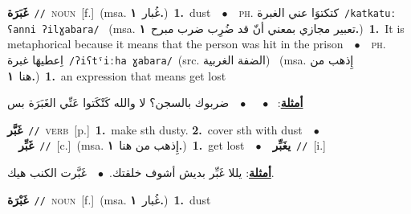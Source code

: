 \documentclass[10pt,a4paper,twoside]{article} %
\begin{document}
\begin{multicols}{2}
{\setlength\topsep{0pt}\textbf{\foreignlanguage{arabic}{غَبَرَة}}\ {\color{gray}\texttt{//}\color{black}}\ \textsc{noun}\ [f.]\ \color{gray}(msa. \foreignlanguage{arabic}{غُبار}~\foreignlanguage{arabic}{\textbf{١.}})\color{black}\ \textbf{1.}~dust\ \ $\bullet$\ \ \textsc{ph.} \color{gray} \foreignlanguage{arabic}{كتكتوَا عني الغبرة}\color{black}\ {\color{gray}\texttt{/{\sffamily katkatuː ʕanni ʔilɣabara}/}\color{black}}\ \color{gray} (msa. \foreignlanguage{arabic}{تعبير مجازي بمعني أنّ قد ضُرِب ضرب مبرح}~\foreignlanguage{arabic}{\textbf{١.}})\color{black}\ \textbf{1.}~It is metaphorical because it means that the person was hit in the prison\ \ $\bullet$\ \ \textsc{ph.} \color{gray} \foreignlanguage{arabic}{اِعطيهَا غبرة}\color{black}\ {\color{gray}\texttt{/{\sffamily ʔiʕtˤiːha ɣabara}/}\color{black}}\ \color{gray}(src. \foreignlanguage{arabic}{الضفة الغربية})\color{black}\ \color{gray} (msa. \foreignlanguage{arabic}{إِذهب من هنا}~\foreignlanguage{arabic}{\textbf{١.}})\color{black}\ \textbf{1.}~an expression that means get lost\  \begin{flushright}\color{gray}\foreignlanguage{arabic}{\textbf{\underline{\foreignlanguage{arabic}{أمثلة}}}: \ $\bullet$\ \  \ $\bullet$\ \  ضربوك بالسجن؟ لا والله كَتْكَتوا عَنِّي الغَبَرَة بس}\end{flushright}\color{black}} \vspace{2mm}

{\setlength\topsep{0pt}\textbf{\foreignlanguage{arabic}{غَبَّر}}\ {\color{gray}\texttt{//}\color{black}}\ \textsc{verb}\ [p.]\ \textbf{1.}~make sth dusty.  \textbf{2.}~cover sth with dust\ \ $\bullet$\ \ \setlength\topsep{0pt}\textbf{\foreignlanguage{arabic}{غَبِّر}}\ {\color{gray}\texttt{//}\color{black}}\ [c.]\ \color{gray}(msa. \foreignlanguage{arabic}{إِذهب من هنا}~\foreignlanguage{arabic}{\textbf{١.}})\color{black}\ \textbf{1.}~get lost\ \ $\bullet$\ \ \setlength\topsep{0pt}\textbf{\foreignlanguage{arabic}{يغَبِّر}}\ {\color{gray}\texttt{//}\color{black}}\ [i.]\  \begin{flushright}\color{gray}\foreignlanguage{arabic}{\textbf{\underline{\foreignlanguage{arabic}{أمثلة}}}: يللا غَبِّر بديش أشوف خلقتك.\ $\bullet$\ \  غَبَّرت الكنب هيك.}\end{flushright}\color{black}} \vspace{2mm}

{\setlength\topsep{0pt}\textbf{\foreignlanguage{arabic}{غَبْرَة}}\ {\color{gray}\texttt{//}\color{black}}\ \textsc{noun}\ [f.]\ \color{gray}(msa. \foreignlanguage{arabic}{غُبار}~\foreignlanguage{arabic}{\textbf{١.}})\color{black}\ \textbf{1.}~dust\ } \vspace{2mm}


\end{multicols}
\end{document}
